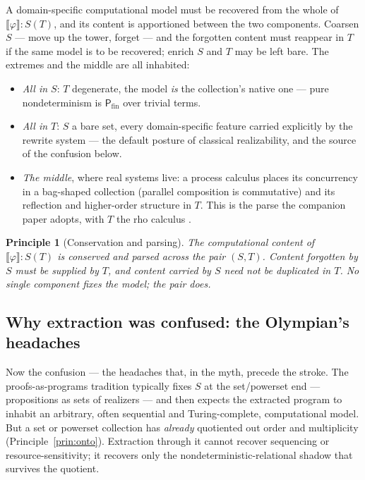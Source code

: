 \documentclass[11pt]{article}
\theoremstyle{definition}
\theoremstyle{plain}
\newtheorem{principle}[definition]{Principle}
\newcommand{\T}{T}
\newcommand{\Coll}{S}
\newcommand{\Pfin}{\mathsf{P}_{\mathrm{fin}}}
\newcommand{\sem}[1]{\llbracket #1 \rrbracket}
\begin{document}
A domain-specific computational model must be recovered from the whole of
$\sem{\varphi}:\Coll(\T)$, and its content is apportioned between the two
components. Coarsen $\Coll$ --- move up the tower, forget --- and the forgotten
content must reappear in $\T$ if the same model is to be recovered; enrich
$\Coll$ and $\T$ may be left bare. The extremes and the middle are all
inhabited:
\begin{itemize}[leftmargin=1.4em]
\item \emph{All in $\Coll$}: $\T$ degenerate, the model \emph{is} the
      collection's native one --- pure nondeterminism is $\Pfin$ over trivial
      terms.
\item \emph{All in $\T$}: $\Coll$ a bare set, every domain-specific feature
      carried explicitly by the rewrite system --- the default posture of
      classical realizability, and the source of the confusion below.
\item \emph{The middle}, where real systems live: a process calculus places
      its concurrency in a bag-shaped collection (parallel composition is
      commutative) and its reflection and higher-order structure in $\T$. This
      is the parse the companion paper adopts, with $\T$ the rho calculus
      \cite{MeredithRadestock05a}.
\end{itemize}

\begin{principle}[Conservation and parsing]
\label{prin:parse}
The computational content of $\sem{\varphi}:\Coll(\T)$ is conserved and parsed
across the pair $(\Coll,\T)$. Content forgotten by $\Coll$ must be supplied by
$\T$, and content carried by $\Coll$ need not be duplicated in $\T$. No single
component fixes the model; the pair does.
\end{principle}

\subsection{Why extraction was confused: the Olympian's headaches}

Now the confusion --- the headaches that, in the myth, precede the stroke. The
proofs-as-programs tradition typically fixes $\Coll$ at
the set/powerset end --- propositions as sets of realizers --- and then expects
the extracted program to inhabit an arbitrary, often sequential and
Turing-complete, computational model. But a set or powerset collection has
\emph{already} quotiented out order and multiplicity
(Principle~\ref{prin:onto}). Extraction through it cannot recover sequencing or
resource-sensitivity; it recovers only the nondeterministic-relational shadow
that survives the quotient.
\end{document}
